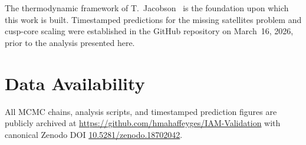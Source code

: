 \documentclass[12pt,a4paper]{article}
\begin{document}
The thermodynamic framework of T.\ Jacobson~\citep{Jacobson1995} is the
foundation upon which this work is built. Timestamped predictions for the
missing satellites problem and cusp-core scaling were established in the
GitHub repository on March~16, 2026, prior to the analysis presented here.

\section*{Data Availability}

All MCMC chains, analysis scripts, and timestamped prediction figures are
publicly archived at \url{https://github.com/hmahaffeyges/IAM-Validation}
with canonical Zenodo DOI
\href{https://doi.org/10.5281/zenodo.18702042}{10.5281/zenodo.18702042}.



\end{document}
